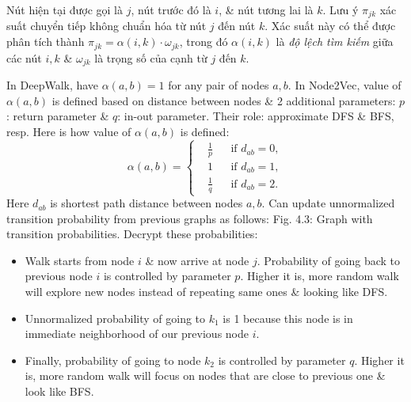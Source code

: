 \documentclass{article}
\begin{document}
\begin{itemize}
\begin{itemize}
\begin{itemize}
\begin{enumerate}
            \end{enumerate}
            Nút hiện tại được gọi là $j$, nút trước đó là $i$, \& nút tương lai là $k$. Lưu ý $\pi_{jk}$ xác suất chuyển tiếp không chuẩn hóa từ nút $j$ đến nút $k$. Xác suất này có thể được phân tích thành $\pi_{jk} = \alpha(i,k)\cdot\omega_{jk}$, trong đó $\alpha(i,k)$ là {\it độ lệch tìm kiếm} giữa các nút $i,k$ \& $\omega_{jk}$ là trọng số của cạnh từ $j$ đến $k$.

            In DeepWalk, have $\alpha(a,b) = 1$ for any pair of nodes $a,b$. In Node2Vec, value of $\alpha(a,b)$ is defined based on distance between nodes \& 2 additional parameters: $p$: return parameter \& $q$: in-out parameter. Their role: approximate DFS \& BFS, resp. Here is how value of $\alpha(a,b)$ is defined:
            \begin{equation*}
                \alpha(a,b) = \left\{\begin{split}
                    &\frac{1}{p}&&\mbox{if } d_{ab} = 0,\\
                    &1&&\mbox{if } d_{ab} = 1,\\
                    &\frac{1}{q}&&\mbox{if } d_{ab} = 2.
                \end{split}\right.
            \end{equation*}
            Here $d_{ab}$ is shortest path distance between nodes $a,b$. Can update unnormalized transition probability from previous graphs as follows: {\sf Fig. 4.3: Graph with transition probabilities}. Decrypt these probabilities:
            \begin{itemize}
                \item Walk starts from node $i$ \& now arrive at node $j$. Probability of going back to previous node $i$ is controlled by parameter $p$. Higher it is, more random walk will explore new nodes instead of repeating same ones \& looking like DFS.
                \item Unnormalized probability of going to $k_1$ is 1 because this node is in immediate neighborhood of our previous node $i$.
                \item Finally, probability of going to node $k_2$ is controlled by parameter $q$. Higher it is, more random walk will focus on nodes that are close to previous one \& look like BFS.


\end{itemize}
\end{itemize}
\end{itemize}
\end{itemize}
\end{document}
